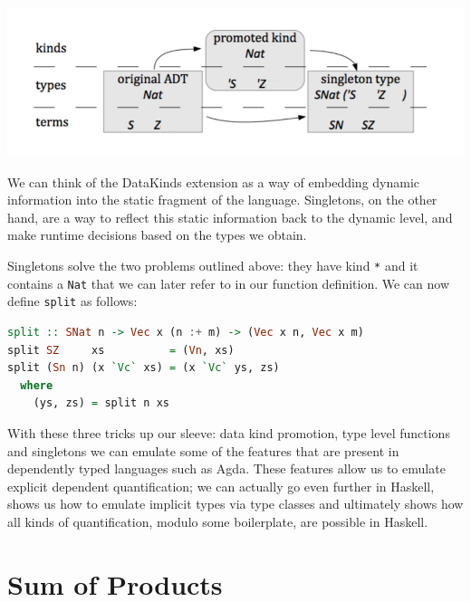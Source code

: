 \documentclass[11pt]{article}
\begin{document}
\includegraphics[width=\textwidth]{singleton.png}


We can think of the DataKinds extension as a way of embedding dynamic information into the static fragment of 
the language. Singletons, on the other hand, are a way to reflect this static information back to 
the dynamic level, and make runtime decisions based on the types we obtain.


Singletons solve the two problems outlined above: they have kind \texttt{*}
and it contains a \texttt{Nat} that we can later refer to in our
function definition. We can now define \texttt{split} as follows:

\begin{lstlisting}[language=haskell]
split :: SNat n -> Vec x (n :+ m) -> (Vec x n, Vec x m)
split SZ     xs          = (Vn, xs)
split (Sn n) (x `Vc` xs) = (x `Vc` ys, zs)
  where
    (ys, zs) = split n xs
\end{lstlisting}

With these three tricks up our sleeve: data kind promotion, type level
functions and singletons we can emulate some of the features that are
present in dependently typed languages such as Agda. These features allow us to 
emulate explicit dependent quantification; we can actually go even further in 
Haskell, \cite{hasochism} shows us how to emulate implicit types via type 
classes and ultimately shows how all kinds of quantification, modulo some boilerplate, are possible in 
Haskell.

\section{Sum of Products}
\end{document}
